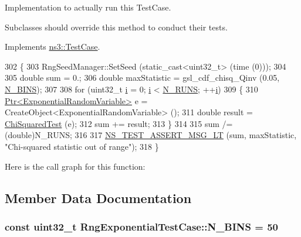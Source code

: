 Implementation to actually run this Test\+Case. 

Subclasses should override this method to conduct their tests. 

Implements \hyperlink{classns3_1_1TestCase_a8ff74680cf017ed42011e4be51917a24}{ns3\+::\+Test\+Case}.


\begin{DoxyCode}
302 \{
303   RngSeedManager::SetSeed (static\_cast<uint32\_t> (time (0)));
304 
305   \textcolor{keywordtype}{double} sum = 0.;
306   \textcolor{keywordtype}{double} maxStatistic = gsl\_cdf\_chisq\_Qinv (0.05, \hyperlink{classRngExponentialTestCase_a3e1ecbc6f135ba2a0e7e8ebbf857266e}{N\_BINS});
307 
308   \textcolor{keywordflow}{for} (uint32\_t \hyperlink{bernuolliDistribution_8m_a6f6ccfcf58b31cb6412107d9d5281426}{i} = 0; \hyperlink{bernuolliDistribution_8m_a6f6ccfcf58b31cb6412107d9d5281426}{i} < \hyperlink{classRngExponentialTestCase_a86f4a0ef3e982f89b5f9998a8a45855c}{N\_RUNS}; ++\hyperlink{bernuolliDistribution_8m_a6f6ccfcf58b31cb6412107d9d5281426}{i})
309     \{
310       \hyperlink{classns3_1_1Ptr}{Ptr<ExponentialRandomVariable>} e = 
      CreateObject<ExponentialRandomVariable> ();
311       \textcolor{keywordtype}{double} result = \hyperlink{classRngExponentialTestCase_a73e697e9720a2cbb13aa8eadbfe798ae}{ChiSquaredTest} (e);
312       sum += result;
313     \}
314 
315   sum /= (double)N\_RUNS;
316 
317   \hyperlink{group__testing_ga1d96848b91407c9a0b36583e8b0ad7ae}{NS\_TEST\_ASSERT\_MSG\_LT} (sum, maxStatistic, \textcolor{stringliteral}{"Chi-squared statistic out of range"});
318 \}
\end{DoxyCode}


Here is the call graph for this function\+:




\subsection{Member Data Documentation}
\subsubsection[{\texorpdfstring{N\+\_\+\+B\+I\+NS}{N_BINS}}]{\setlength{\rightskip}{0pt plus 5cm}const uint32\+\_\+t Rng\+Exponential\+Test\+Case\+::\+N\+\_\+\+B\+I\+NS = 50\hspace{0.3cm}{\ttfamily [static]}}\hypertarget{classRngExponentialTestCase_a3e1ecbc6f135ba2a0e7e8ebbf857266e}{}\label{classRngExponentialTestCase_a3e1ecbc6f135ba2a0e7e8ebbf857266e}

